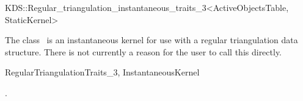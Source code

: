 

\begin{ccRefClass}{KDS::Regular_triangulation_instantaneous_traits_3<ActiveObjectsTable, StaticKernel>}  %


\ccDefinition
  
The class \ccRefName\ is an instantaneous kernel for use with a
regular triangulation data structure. There is not currently a reason
for the user to call this directly.


\ccIsModel

RegularTriangulationTraits\_3, InstantaneousKernel

\ccSeeAlso

.

\ccExample


\end{ccRefClass}


